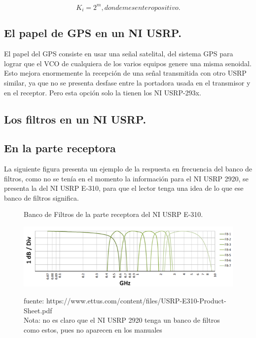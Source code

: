 \begin{equation} \label{captres_dos}	
K_{i} = 2^{m}, donde m es entero positivo. 
\end{equation}


\subsection{El papel de GPS en un NI USRP.}

El papel del GPS consiste en usar una señal satelital, del sistema GPS para lograr que el VCO de cualquiera de los varios equipos genere una misma senoidal. Esto mejora enormemente la recepción de una señal transmitida con otro USRP similar, ya que no se presenta desfase entre la portadora usada en el transmisor y en el receptor. Pero esta opción solo la tienen los NI USRP-293x.\\

\subsection{Los filtros en un NI USRP.}

\subsection*{En la parte receptora} 
La siguiente figura presenta un ejemplo de la respuesta en frecuencia del banco de filtros, como no se tenía en el momento la información para el NI USRP 2920, se presenta la del NI USRP E-310, para que el lector tenga una idea de lo que ese banco de filtros significa.

\begin{figure}[h!]
	\captionsetup{justification = raggedright, singlelinecheck = false}
	\caption{Banco de Filtros de la parte receptora del NI USRP E-310.} 
	\centering
	\includegraphics[scale=1]{Imagenes/Banco-filtros.png}
	\label{fig:Banco-filtros}
			\caption*{fuente: https://www.ettus.com/content/files/USRP-E310-Product-Sheet.pdf \\
			Nota: no es claro que el NI USRP 2920 tenga un banco de filtros como estos, pues no aparecen en los manuales}
\end{figure}

